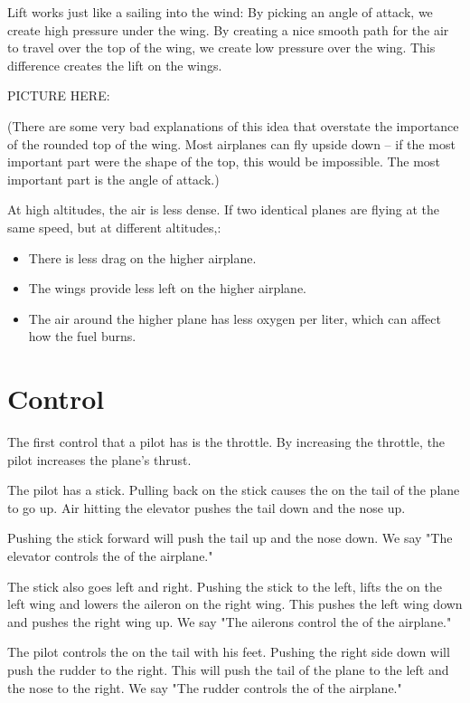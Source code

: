 Lift works just like a sailing into the wind: By picking an angle of attack,   we create high pressure under the wing.  By creating a nice smooth path for the 
air to travel over the top of the wing,  we create low pressure over the wing.  This difference creates the lift on the wings.

PICTURE HERE:

(There are some very bad explanations of this idea that overstate the importance of the rounded top of the wing.   Most airplanes can fly upside down -- if the 
most important part were the shape of the top,  this would be impossible.  The most important part is the angle of attack.)

At high altitudes,  the air is less dense.  If two identical planes are flying  at the same speed,  but at different altitudes,: 
\begin{itemize}
\item There is less drag on the higher airplane.
\item The wings provide less left on the higher airplane.
\item The air around the higher plane has less oxygen per liter,  which can affect how the fuel burns.
\end{itemize}

\section{Control}

The first control that a pilot has is the throttle.   By increasing the throttle,  the pilot increases the plane's thrust.

The pilot has a stick.  Pulling back on the stick causes the  on the tail of the plane to go up.  Air hitting the elevator pushes the tail down and the nose up. 


Pushing the stick forward will push the tail up and the nose down.  We say "The elevator controls the  of the airplane."

The stick also goes left and right.   Pushing the stick to the left,  lifts the  on the left wing and lowers the aileron on the right wing.  This pushes the left wing down and 
pushes the right wing up.  We say "The ailerons control the   of the airplane."

The pilot controls the  on the tail with his feet.   Pushing the right side down will push the rudder to the right.  This will push the tail of the plane to the left and the 
nose to the right.  We say "The rudder controls the  of the airplane."


